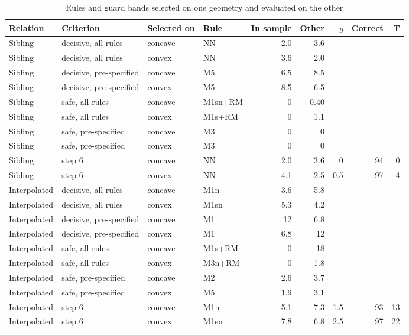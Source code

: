 \documentclass[pdflatex,sn-basic]{sn-jnl}
\newcommand{\tabsizesmall}{\footnotesize}
\begin{document}
\begin{table}[p]
\tabsizesmall
\setlength{\tabcolsep}{3pt}
\caption{Rules and guard bands selected on one geometry and evaluated on the other}\label{tab:s-crossfit}
\begin{tabular}{@{}llllrrrrr@{}}
\toprule
Relation & Criterion & Selected on & Rule & In sample & Other & $g$ & Correct & T \\
\midrule
Sibling & decisive, all rules & concave & NN & 2.0 & 3.6 & & & \\
Sibling & decisive, all rules & convex & NN & 3.6 & 2.0 & & & \\
Sibling & decisive, pre-specified & concave & M5 & 6.5 & 8.5 & & & \\
Sibling & decisive, pre-specified & convex & M5 & 8.5 & 6.5 & & & \\
Sibling & safe, all rules & concave & M1sn+RM & 0 & 0.40 & & & \\
Sibling & safe, all rules & convex & M1s+RM & 0 & 1.1 & & & \\
Sibling & safe, pre-specified & concave & M3 & 0 & 0 & & & \\
Sibling & safe, pre-specified & convex & M3 & 0 & 0 & & & \\
Sibling & step 6 & concave & NN & 2.0 & 3.6 & 0 & 94 & 0 \\
Sibling & step 6 & convex & NN & 4.1 & 2.5 & 0.5 & 97 & 4 \\
Interpolated & decisive, all rules & concave & M1n & 3.6 & 5.8 & & & \\
Interpolated & decisive, all rules & convex & M1sn & 5.3 & 4.2 & & & \\
Interpolated & decisive, pre-specified & concave & M1 & 12 & 6.8 & & & \\
Interpolated & decisive, pre-specified & convex & M1 & 6.8 & 12 & & & \\
Interpolated & safe, all rules & concave & M1s+RM & 0 & 18 & & & \\
Interpolated & safe, all rules & convex & M3n+RM & 0 & 1.8 & & & \\
Interpolated & safe, pre-specified & concave & M2 & 2.6 & 3.7 & & & \\
Interpolated & safe, pre-specified & convex & M5 & 1.9 & 3.1 & & & \\
Interpolated & step 6 & concave & M1n & 5.1 & 7.3 & 1.5 & 93 & 13 \\
Interpolated & step 6 & convex & M1sn & 7.8 & 6.8 & 2.5 & 97 & 22 \\

\end{tabular}
\end{table}
\end{document}
